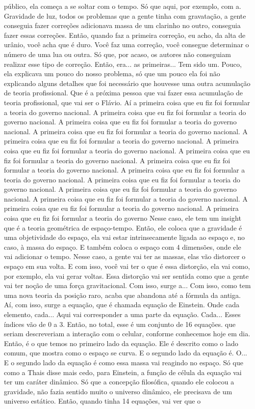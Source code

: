 \documentclass[
	article,			%
	11pt,				%
	twoside,			%
	a4paper,			%
	english,			%
	brazil,				%
	sumario=tradicional
	]{abntex2}
\begin{document}
público, ela começa a se soltar com o tempo. Só que aqui, por exemplo, com a. Gravidade de luz, todos os problemas que a gente tinha com gravatação, a gente conseguia fazer correções adicionava massa de um clarinho no outro, conseguia fazer essas correções. Então, quando faz a primeira correção, eu acho, da alta de urânio, você acha que é duro. Você faz uma correção, você consegue determinar o número de uma lua ou outra. Só que, por acaso, os autores não conseguiam realizar esse tipo de correção. Então, era... as primeiras... Tem sido um. Pouco, ela explicava um pouco do nosso problema, só que um pouco ela foi não explicando alguns detalhes que foi necessário que houvesse uma outra acumulação de teoria profissional. Que é a próxima pessoa que vai fazer essa acumulação de teoria profissional, que vai ser o Flávio. Aí a primeira coisa que eu fiz foi formular a teoria do governo nacional. A primeira coisa que eu fiz foi formular a teoria do governo nacional. A primeira coisa que eu fiz foi formular a teoria do governo nacional. A primeira coisa que eu fiz foi formular a teoria do governo nacional. A primeira coisa que eu fiz foi formular a teoria do governo nacional. A primeira coisa que eu fiz foi formular a teoria do governo nacional. A primeira coisa que eu fiz foi formular a teoria do governo nacional. A primeira coisa que eu fiz foi formular a teoria do governo nacional. A primeira coisa que eu fiz foi formular a teoria do governo nacional. A primeira coisa que eu fiz foi formular a teoria do governo nacional. A primeira coisa que eu fiz foi formular a teoria do governo nacional. A primeira coisa que eu fiz foi formular a teoria do governo nacional. A primeira coisa que eu fiz foi formular a teoria do governo nacional. A primeira coisa que eu fiz foi formular a teoria do governo Nesse caso, ele tem um insight que é a teoria geométrica de espaço-tempo. Então, ele coloca que a gravidade é uma objetividade do espaço, ela vai estar intrinsecamente ligada ao espaço e, no caso, à massa do espaço. E também coloca o espaço com 4 dimensões, onde ele vai adicionar o tempo. Nesse caso, a gente vai ter as massas, elas vão distorcer o espaço em sua volta. E com isso, você vai ter o que é essa distorção, ela vai como, por exemplo, ela vai gerar voltas. Essa distorção vai ser sentida como que a gente vai ter noção de uma força gravitacional. Com isso, surge a... Com isso, como tem uma nova teoria da posição raro, acaba que abandona até a fórmula da antiga. Aí, com isso, surge a equação, que é chamada equação de Einstein. Onde cada elemento, cada... Aqui vai corresponder a uma parte da equação. Cada... Esses índices vão de 0 a 3. Então, no total, esse é um conjunto de 16 equações. que seriam descreveriam a interação com o celular, conforme conhecemos hoje em dia. Então, é o que temos no primeiro lado da equação. Ele é descrito como o lado comum, que mostra como o espaço se curva. E o segundo lado da equação é. O... E o segundo lado da equação é como essa massa vai reagindo no espaço. Só que como a Thais disse mais cedo, para Einstein, a função de célula da equação vai ter um caráter dinâmico. Só que a concepção filosófica, quando ele colocou a gravidade, não fazia sentido muito o universo dinâmico, ele precisava de um universo estático. Então, quando tinha 14 equações, vai ver que o 
\end{document}
